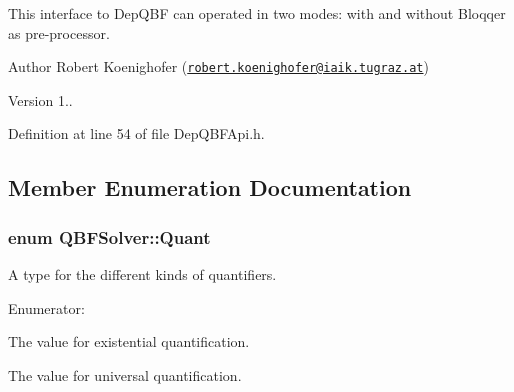 This interface to Dep\-Q\-B\-F can operated in two modes\-: with and without Bloqqer as pre-\/processor.

\begin{DoxyAuthor}{Author}
Robert Koenighofer (\href{mailto:robert.koenighofer@iaik.tugraz.at}{\tt robert.\-koenighofer@iaik.\-tugraz.\-at}) 
\end{DoxyAuthor}
\begin{DoxyVersion}{Version}
1.. 
\end{DoxyVersion}


Definition at line 54 of file Dep\-Q\-B\-F\-Api.\-h.



\subsection{Member Enumeration Documentation}
\hypertarget{classQBFSolver_ac091e263cb55286cc07b2451bcf4d3c7}{
\subsubsection[{Quant}]{\setlength{\rightskip}{0pt plus 5cm}enum {\bf Q\-B\-F\-Solver\-::\-Quant}\hspace{0.3cm}{\ttfamily [inherited]}}}\label{classQBFSolver_ac091e263cb55286cc07b2451bcf4d3c7}


A type for the different kinds of quantifiers. 

\begin{Desc}
\item[Enumerator\-: ]\par
\begin{description}
\item[{\em 
\hypertarget{classQBFSolver_ac091e263cb55286cc07b2451bcf4d3c7a090ab4a5b262710ccd80e97d72f9a7b3}{E}\label{classQBFSolver_ac091e263cb55286cc07b2451bcf4d3c7a090ab4a5b262710ccd80e97d72f9a7b3}
}]The value for existential quantification. \item[{\em 
\hypertarget{classQBFSolver_ac091e263cb55286cc07b2451bcf4d3c7afd6518d5d985aa8346ac071e4c0d8ee0}{A}\label{classQBFSolver_ac091e263cb55286cc07b2451bcf4d3c7afd6518d5d985aa8346ac071e4c0d8ee0}
}]The value for universal quantification. \end{description}
\end{Desc}



